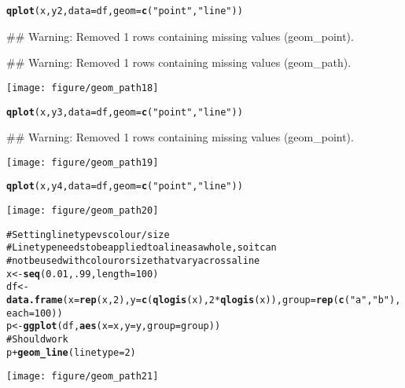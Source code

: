 \documentclass[a4paper,titlepage]{tufte-handout}\usepackage{graphicx, color}
\makeatletter
\def\maxwidth{ %
  \ifdim\Gin@nat@width>\linewidth
    \linewidth
  \else
    \Gin@nat@width
  \fi
}
\newcommand{\hlfunctioncall}[1]{\textcolor[rgb]{0.501960784313725,0,0.329411764705882}{\textbf{#1}}}%
\newcommand{\hlstring}[1]{\textcolor[rgb]{0.6,0.6,1}{#1}}%
\newcommand{\hlcomment}[1]{\textcolor[rgb]{0.180392156862745,0.6,0.341176470588235}{#1}}%
\newenvironment{kframe}{%
 \def\at@end@of@kframe{}%
 \ifinner\ifhmode%
  \def\at@end@of@kframe{\end{minipage}}%
  \begin{minipage}{\columnwidth}%
 \fi\fi%
 \def\FrameCommand##1{\hskip\@totalleftmargin \hskip-\fboxsep
 \colorbox{shadecolor}{##1}\hskip-\fboxsep
     \hskip-\linewidth \hskip-\@totalleftmargin \hskip\columnwidth}%
 \MakeFramed {\advance\hsize-\width
   \@totalleftmargin\z@ \linewidth\hsize
   \@setminipage}}%
 {\par\unskip\endMakeFramed%
 \at@end@of@kframe}
\newenvironment{knitrout}{}{} %
\makeatother
\begin{document}
\begin{knitrout}
\begin{kframe}
\begin{alltt}
\hlfunctioncall{qplot}(x, y2, data = df, geom = \hlfunctioncall{c}(\hlstring{"point"},\hlstring{"line"}))
\end{alltt}
\begin{flushleft}\ttfamily\noindent\textcolor{warningcolor}{\#\# Warning: Removed 1 rows containing missing values (geom\_point).}\end{flushleft}\begin{flushleft}\ttfamily\noindent\textcolor{warningcolor}{\#\# Warning: Removed 1 rows containing missing values (geom\_path).}\end{flushleft}\end{kframe}\texttt{[image: figure/geom\_path18]} \begin{kframe}\begin{alltt}
\hlfunctioncall{qplot}(x, y3, data = df, geom = \hlfunctioncall{c}(\hlstring{"point"},\hlstring{"line"}))
\end{alltt}
\begin{flushleft}\ttfamily\noindent\textcolor{warningcolor}{\#\# Warning: Removed 1 rows containing missing values (geom\_point).}\end{flushleft}\end{kframe}\texttt{[image: figure/geom\_path19]} \begin{kframe}\begin{alltt}
\hlfunctioncall{qplot}(x, y4, data = df, geom = \hlfunctioncall{c}(\hlstring{"point"},\hlstring{"line"}))
\end{alltt}
\end{kframe}\texttt{[image: figure/geom\_path20]} \begin{kframe}\begin{alltt}
\hlcomment{# Setting line type vs colour/size}
\hlcomment{# Line type needs to be applied to a line as a whole, so it can}
\hlcomment{# not be used with colour or size that vary across a line}
x <- \hlfunctioncall{seq}(0.01, .99, length=100)
df <- \hlfunctioncall{data.frame}(x = \hlfunctioncall{rep}(x, 2), y = \hlfunctioncall{c}(\hlfunctioncall{qlogis}(x), 2 * \hlfunctioncall{qlogis}(x)), group = \hlfunctioncall{rep}(\hlfunctioncall{c}(\hlstring{"a"},\hlstring{"b"}), each=100))
p <- \hlfunctioncall{ggplot}(df, \hlfunctioncall{aes}(x=x, y=y, group=group))
\hlcomment{# Should work}
p + \hlfunctioncall{geom_line}(linetype = 2)
\end{alltt}
\end{kframe}\texttt{[image: figure/geom\_path21]} \begin{kframe}\begin{alltt}

\end{alltt}
\end{kframe}
\end{knitrout}
\end{document}
